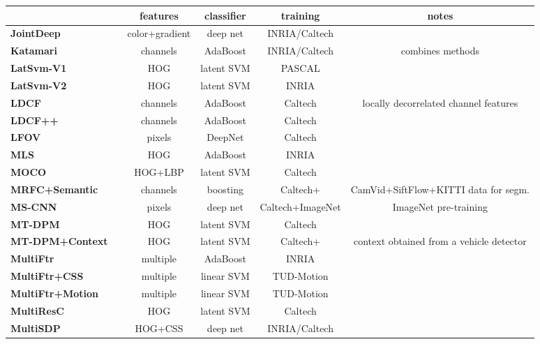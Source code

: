 \documentclass[onecolumn]{article}
\begin{document}
\begin{table}[!h]\centering\footnotesize
\begin{tabular}{@{}l@{\cp}c|c@{\cp}c@{\cp}c|c@{}}
  & & features & classifier & training & notes \\\toprule[0.5mm]
  \textbf{JointDeep} & \cite{OuyangICCV13} & color+gradient & deep net & INRIA/Caltech & \\
  \textbf{Katamari} & \cite{BenensonECCV14} & channels & AdaBoost & INRIA/Caltech & 
   combines methods \cite{BenensonCVPR12,DollarPAMI14,NamNIPS14,OuyangCVPR13a,ParkCVPR13} \\
  \textbf{LatSvm-V1} & \cite{FelzenszwalbCVPR08} & HOG & latent SVM & PASCAL & \\
  \textbf{LatSvm-V2} & \cite{FelzenszwalbPAMI10} & HOG & latent SVM & INRIA & \\
  \textbf{LDCF} & \cite{NamNIPS14} & channels & AdaBoost & Caltech &
   locally decorrelated channel features\\
  \textbf{LDCF++} & \cite{OhnBarICPR16} & channels & AdaBoost & Caltech & \\
  \textbf{LFOV} & \cite{AngelovaICRA15} & pixels & DeepNet & Caltech & \\
  \textbf{MLS} & \cite{NamICCV11} & HOG & AdaBoost & INRIA & \\
  \textbf{MOCO} & \cite{ChenCVPR13} & HOG+LBP & latent SVM & Caltech & \\
  \textbf{MRFC+Semantic} & \cite{CosteaCVPR16} & channels & boosting &
   Caltech+ & CamVid+SiftFlow+KITTI data for segm.\\
  \textbf{MS-CNN} & \cite{CaiECCV16} & pixels & deep net & Caltech+ImageNet & ImageNet pre-training \\
  \textbf{MT-DPM} & \cite{YanCVPR13} & HOG & latent SVM & Caltech & \\
  \textbf{MT-DPM+Context} & \cite{YanCVPR13} & HOG & latent SVM & Caltech+ &
   context obtained from a vehicle detector \\
  \textbf{MultiFtr} & \cite{WojekDAGM08} & multiple & AdaBoost & INRIA & \\
  \textbf{MultiFtr+CSS} & \cite{WalkCVPR10} & multiple & linear SVM & TUD-Motion & \\
  \textbf{MultiFtr+Motion} & \cite{WalkCVPR10} & multiple & linear SVM & TUD-Motion & \\
  \textbf{MultiResC} & \cite{ParkECCV10} & HOG & latent SVM & Caltech & \\
  \textbf{MultiSDP} & \cite{ZengICCV13} & HOG+CSS & deep net & INRIA/Caltech & \\

\end{tabular}
\end{table}
\end{document}
